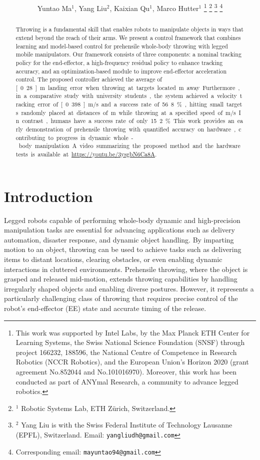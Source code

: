 \documentclass[letterpaper, 10 pt, conference]{ieeeconf} %
\title{\LARGE \bf \TheTitle} %
\author{Yuntao Ma$^1$, Yang Liu$^2$, Kaixian Qu$^1$, Marco Hutter$^1$%
    \thanks{This work was supported by Intel Labs, by the Max Planck ETH Center for Learning Systems, the Swiss National Science Foundation (SNSF) through project 166232, 188596, the National Centre of Competence in Research Robotics (NCCR Robotics), and the European Union's Horizon 2020 (grant agreement No.852044 and No.101016970). Moreover, this work has been conducted as part of ANYmal Research, a community to advance legged robotics.}%
    \thanks{$^1$ Robotic Systems Lab, ETH Z\"u{}rich, Switzerland.}%
    \thanks{$^2$ Yang Liu is with the Swiss Federal Institute of Technology Lausanne (EPFL), Switzerland. Email: {\tt\footnotesize yangliudh@gmail.com}}%
    \thanks{Corresponding email: {\tt\footnotesize mayuntao94@gmail.com}}%
}
\begin{document}
\maketitle
%
\thispagestyle{empty}
\pagestyle{empty}
%
%
\begin{abstract}

Throwing is a fundamental skill that enables robots to manipulate objects in ways that extend beyond the reach of their arms. We present a control framework that combines learning and model-based control for prehensile whole-body throwing with legged mobile manipulators. Our framework consists of three components: a nominal tracking policy for the end-effector, a high-frequency residual policy to enhance tracking accuracy, and an optimization-based module to improve end-effector acceleration control. The proposed controller achieved the average of \unit[0.28]{m} landing error when throwing at targets located \unit[6]{m} away. Furthermore, in a comparative study with university students, the system achieved a velocity tracking error of \unit[0.398]{m/s} and a success rate of 56.8\%, hitting small targets randomly placed at distances of \unit[3-5]{m} while throwing at a specified speed of \unit[6]{m/s}. In contrast, humans have a success rate of only 15.2\%. This work provides an early demonstration of prehensile throwing with quantified accuracy on hardware, contributing to progress in dynamic whole-body manipulation. A video summarizing the proposed method and the hardware tests is available at \href{https://youtu.be/3ysgbN6Ca8A}{https://youtu.be/3ysgbN6Ca8A}.
\end{abstract}

%
%

\section{Introduction}\label{sec:introduction}

Legged robots capable of performing whole-body dynamic and high-precision manipulation tasks are essential for advancing applications such as delivery automation, disaster response, and dynamic object handling. By imparting motion to an object, throwing can be used to achieve tasks such as delivering items to distant locations, clearing obstacles, or even enabling dynamic interactions in cluttered environments. Prehensile throwing, where the object is grasped and released mid-motion, extends throwing capabilities by handling irregularly shaped objects and enabling diverse postures. However, it represents a particularly challenging class of throwing that requires precise control of the robot’s end-effector (EE) state and accurate timing of the release.
\end{document}

